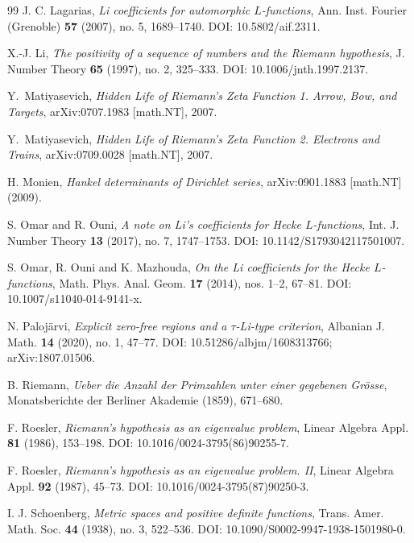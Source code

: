 \documentclass[preprint,12pt]{elsarticle}
\numberwithin{equation}{section}
\theoremstyle{plain}
\theoremstyle{definition}
\theoremstyle{remark}
\begin{document}
\begin{thebibliography}{99}
J. C. Lagarias,
\emph{Li coefficients for automorphic $L$-functions},
Ann. Inst. Fourier (Grenoble) \textbf{57} (2007), no. 5, 1689--1740.
DOI: 10.5802/aif.2311.

X.-J. Li,
\emph{The positivity of a sequence of numbers and the Riemann hypothesis},
J. Number Theory \textbf{65} (1997), no. 2, 325--333.
DOI: 10.1006/jnth.1997.2137.

Y.~Matiyasevich,
\emph{Hidden Life of Riemann's Zeta Function 1. Arrow, Bow, and Targets},
arXiv:0707.1983 [math.NT], 2007.

Y.~Matiyasevich,
\emph{Hidden Life of Riemann's Zeta Function 2. Electrons and Trains},
arXiv:0709.0028 [math.NT], 2007.

H. Monien,
\emph{Hankel determinants of Dirichlet series},
arXiv:0901.1883 [math.NT] (2009).

S. Omar and R. Ouni,
\emph{A note on Li's coefficients for Hecke $L$-functions},
Int. J. Number Theory \textbf{13} (2017), no. 7, 1747--1753.
DOI: 10.1142/S1793042117501007.

S. Omar, R. Ouni and K. Mazhouda,
\emph{On the Li coefficients for the Hecke $L$-functions},
Math. Phys. Anal. Geom. \textbf{17} (2014), nos. 1--2, 67--81.
DOI: 10.1007/s11040-014-9141-x.

N. Paloj\"arvi,
\emph{Explicit zero-free regions and a $\tau$-Li-type criterion},
Albanian J. Math. \textbf{14} (2020), no. 1, 47--77.
DOI: 10.51286/albjm/1608313766; arXiv:1807.01506.

B. Riemann,
\emph{Ueber die Anzahl der Primzahlen unter einer gegebenen Gr\"osse},
Monatsberichte der Berliner Akademie (1859), 671--680.

F. Roesler,
\emph{Riemann's hypothesis as an eigenvalue problem},
Linear Algebra Appl. \textbf{81} (1986), 153--198.
DOI: 10.1016/0024-3795(86)90255-7.

F. Roesler,
\emph{Riemann's hypothesis as an eigenvalue problem. II},
Linear Algebra Appl. \textbf{92} (1987), 45--73.
DOI: 10.1016/0024-3795(87)90250-3.

I. J. Schoenberg,
\emph{Metric spaces and positive definite functions},
Trans. Amer. Math. Soc. \textbf{44} (1938), no. 3, 522--536.
DOI: 10.1090/S0002-9947-1938-1501980-0.


\end{thebibliography}
\end{document}
